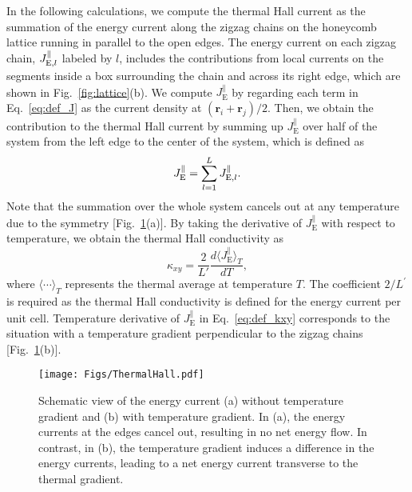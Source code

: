\documentclass[twocolumn,superscriptaddress,showpacs, longbibliography, aps, prx]{revtex4-2}
\begin{document}
In the following calculations, we compute the thermal Hall current as the summation of the energy current along the zigzag chains on the honeycomb lattice running in parallel to the open edges. 
The energy current on each zigzag chain, $J_{{\rm E},l}^\parallel$ labeled by $l$, includes the contributions from local currents on the segments inside a box surrounding the chain and across its right edge, which are shown in Fig.~\ref{fig:lattice}(b). 
We compute {$J_{\mathrm{E}}^{\parallel}$} by regarding each term in Eq.~\eqref{eq:def_J} as the current density at $(\bm{r}_i + \bm{r}_j)/2$. Then, we obtain the contribution to the thermal Hall current by summing up $J_{\mathrm{E}}^{\parallel}$ over half of the system from the left edge to the center of the system, which is defined as
\begin{align}
J_{\rm E}^\parallel=\sum_{l=1}^{L}J_{{\rm E},l}^\parallel.
\label{eq:JE}
\end{align} 
Note that the summation over the whole system cancels out at any temperature due to the symmetry [Fig.~\ref{fig:ThermalHall}(a)]. 
By taking the derivative of $J_{\mathrm{E}}^{\parallel}$ with respect to temperature, we obtain the thermal Hall conductivity as 
\begin{equation}
 \kappa_{xy}=\frac{2}{L'} \frac{d \langle J_{\mathrm{E}}^{\parallel}\rangle_{T}}{d T},
\label{eq:def_kxy}
\end{equation}
where $\langle \cdots \rangle_T$ represents the thermal average at temperature $T$.
The coefficient $2/L^\prime$ is required as the thermal Hall conductivity is defined for the energy current per unit cell. 
Temperature derivative of $J_{\mathrm{E}}^\parallel$ in Eq.~\eqref{eq:def_kxy} corresponds to the situation with a temperature gradient perpendicular to the zigzag chains [Fig.~\ref{fig:ThermalHall}(b)].

\begin{figure}
  \begin{center}
    \texttt{[image: Figs/ThermalHall.pdf]}    
  \end{center}
  \caption{
    Schematic view of the energy current (a) without temperature gradient and (b) with temperature gradient. 
    In (a), the energy currents at the edges cancel out, resulting in no net energy flow. 
    In contrast, in (b), the temperature gradient induces a difference in the energy currents, leading to a net energy current transverse to the thermal gradient.
  }
  \label{fig:ThermalHall}
\end{figure}
\end{document}
